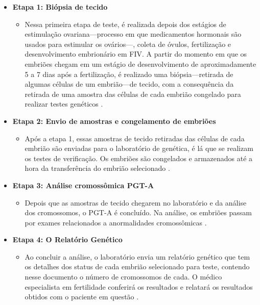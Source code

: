 \begin{itemize}
    \item \textbf{Etapa 1: Biópsia de tecido}
    \begin{itemize}
        \item Nessa primeira etapa de teste, é realizada depois dos estágios de estimulação ovariana—processo em que medicamentos hormonais são usados para estimular os ovários—, coleta de óvulos, fertilização e desenvolvimento embrionário em FIV. A partir do momento em que os embriões chegam em um estágio de desenvolvimento de aproximadamente 5 a 7 dias após a fertilização, é realizado uma biópsia—retirada de algumas células de um embrião—de tecido, com a consequência da retirada de uma amostra das células de cada embrião congelado para realizar testes genéticos \cite{cnyfertility2024}. 
    \end{itemize}

    \item \textbf{Etapa 2: Envio de amostras e congelamento de embriões}
    \begin{itemize}
        \item Após a etapa 1, essas amostras de tecido retiradas das células de cada embrião são enviadas para o laboratório de genética, é lá que se realizam os testes de verificação. Os embriões são congelados e armazenados até a hora da transferência do embrião selecionado \cite{cnyfertility2024}. 
    \end{itemize}

    \item \textbf{Etapa 3: Análise cromossômica PGT-A}
    \begin{itemize}
        \item Depois que as amostras de tecido chegarem no laboratório e da análise dos cromossomos, o PGT-A é concluído. Na análise, os embriões passam por exames relacionados a anormalidades cromossômicas \cite{cnyfertility2024}. 
    \end{itemize}

    \item \textbf{Etapa 4: O Relatório Genético}
    \begin{itemize}
        \item Ao concluir a análise, o laboratório envia um relatório genético que tem os detalhes dos status de cada embrião selecionado para teste, contendo nesse documento o número de cromossomos de cada. O médico especialista em fertilidade conferirá os resultados e relatará os resultados obtidos com o paciente em questão \cite{cnyfertility2024}. 
    \end{itemize}


\end{itemize}
